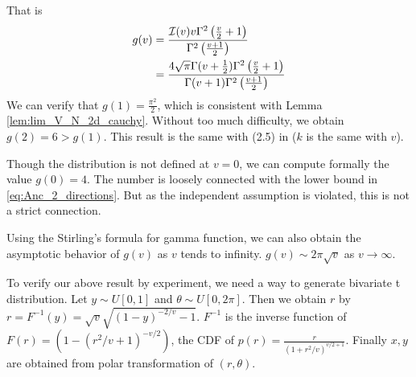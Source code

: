 \documentclass{article}
\begin{document}
That is
\begin{align}
    g(v) &= \frac{\mathcal{I}(v) v \Gamma^2\left(\frac{v}{2}+1\right)}
    {\Gamma^2 \left(\frac{v+1}{2} \right)} \notag \\
    &= \frac{4\sqrt{\pi}
    \Gamma(v+\frac{1}{2})\Gamma^2\left(\frac{v}{2}+1\right)}
    {\Gamma(v+1)\Gamma^2 \left(\frac{v+1}{2} \right)}
    \label{eq:def_g_v}
\end{align}
We can verify that $g(1) = \frac{\pi^2}{2}$,
which is consistent with Lemma \ref{lem:lim_V_N_2d_cauchy}.
Without too much difficulty, we obtain $g(2)=6>g(1)$.
This result is the same with (2.5) in \cite{carnal1970konvexe}
($k$ is the same with $v$).

Though the distribution is not defined at $v=0$,
we can compute formally the value $g(0)=4$.
The number is loosely connected with the lower bound in \eqref{eq:Anc_2_directions}.
But as the independent assumption is violated, this is not
a strict connection.

Using the Stirling's formula for gamma function, we can also
obtain the asymptotic behavior of $g(v)$
as $v$ tends to infinity.
$g(v) \sim 2\pi \sqrt{v}$
as $v\to \infty$.

To verify our above result by experiment,
we need a way
to generate bivariate t distribution.
Let $y \sim U[0,1]$ and $\theta \sim
U[0, 2\pi]$. Then we obtain $r$
by $r=F^{-1}(y) = \sqrt{v}\sqrt{(1-y)^{-2/v}-1}$.
$F^{-1}$ is the inverse function
of $F(r)=
\left(1-(r^2/v+1)^{-v/2}
\right)$, the CDF of
$p(r)= 
\frac{r}{(1+r^2/v)^{v/2 + 1}}$.
Finally $x,y$ are obtained from polar transformation
of $(r,\theta)$.
\end{document}
